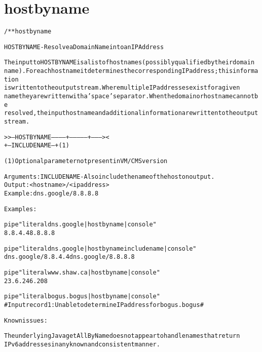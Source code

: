 \section{hostbyname}
\begin{shaded}
\begin{alltt}
/** hostbyname

   HOSTBYNAME - Resolve a Domain Name into an IP Address
   
   The input to HOSTBYNAME is a list of hostnames (possibly qualified by their domain
   name).  For each hostname it determines the corresponding IP address; this information 
   is written to the output stream.  Where multiple IP addresses exist for a given
   name they are written with a 'space' separator.  When the domain or host name cannot be 
   resolved, the input hostname and additional information are written to the output
   stream.
                                              
   >>---HOSTBYNAME -----------+---------------+--------><
                              +--INCLUDENAME--+  (1)   
   
   
     (1) Optional parameter not present in VM/CMS version
   
     Arguments:  INCLUDENAME        - Also include the name of the host on output.
                                      Output:   <hostname>/<ip address>
                                      Example:  dns.google/8.8.8.8

   Examples:
   
      pipe "literal dns.google | hostbyname | console"
      8.8.4.4 8.8.8.8
   	  
      pipe "literal dns.google | hostbyname includename | console"
      dns.google/8.8.4.4 dns.google/8.8.8.8
   	  
      pipe "literal www.shaw.ca | hostbyname | console"
      23.6.246.208
   	  
      pipe "literal bogus.bogus | hostbyname | console"
      # Input record 1: Unable to determine IP address for bogus.bogus #								  
									  
   Known issues:  
   
      The underlying Java getAllByName does not appear to handle names that return
      IPv6 addresses in any known and consistent manner. 


\end{alltt}
\end{shaded}

